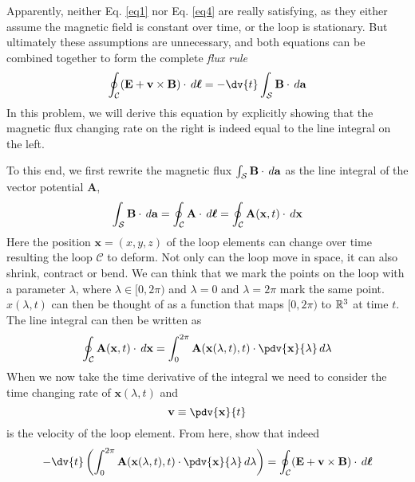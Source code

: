 \documentclass[10pt]{article}
\begin{document}
	Apparently, neither Eq. \ref{eq1} nor Eq. \ref{eq4} are really satisfying, as they either assume the
	magnetic field is constant over time, or the loop is stationary. But ultimately these assumptions are
	unnecessary, and both equations can be combined together to form the complete \textit{flux rule}
	\[
		\oint_{\mathcal{C}} (\mathbf{E} + \mathbf{v} \times \mathbf{B}) \cdot \diff \boldsymbol{\ell} =
		-\dv{t} \int_{\mathcal{S}}\mathbf{B} \cdot \diff \mathbf{a}
	\]
	In this problem, we will derive this equation by explicitly showing that the magnetic flux changing rate
	on the right is indeed equal to the line integral on the left. 

	To this end, we first rewrite the magnetic flux \( \int_{\mathcal{S}}\mathbf{B} \cdot \,d \mathbf{a} \)
	as the line integral of the vector potential \( \mathbf{A} \),
	\[
		\int_{\mathcal{S}}\mathbf{B} \cdot \,d \mathbf{a} = \oint_{\mathcal{C}}\mathbf{A} \cdot \,d
		\boldsymbol{\ell} = \oint_{\mathcal{C}} \mathbf{A} (\mathbf{x}, t) \cdot \,d \mathbf{x}
	\]
	Here the position \( \mathbf{x} = (x, y, z) \) of the loop elements can change over time resulting the
	loop \( \mathcal{C} \) to deform. Not only can the loop move in space, it can also shrink, contract or
	bend. We can think that we mark the points on the loop with a parameter \( \lambda \), where \( \lambda
	\in [0, 2\pi) \) and \( \lambda = 0 \) and \( \lambda = 2\pi \) mark the same point. \( x(\lambda, t) \)
	can then be thought of as a function that maps \( [0, 2\pi) \) to \( \mathbb R^3 \) at time \( t \). The line
	integral can then be written as
	\[
		\oint_{\mathcal{C}}\mathbf{A}(\mathbf{x}, t) \cdot \diff \mathbf{x} = \int_{0}^{2\pi}
		\mathbf{A}(\mathbf{x}(\lambda, t), t) \cdot \pdv{\mathbf{x}}{\lambda} \diff \lambda
	\]
	When we now take the time derivative of the integral we need to consider the time changing rate of \(
	\mathbf{x}(\lambda, t) \) and 
	\[
		\mathbf{v} \equiv \pdv{\mathbf{x}}{t}
	\]
	is the velocity of the loop element. From here, show that indeed
	\[
		-\dv{t}\left( \int_{0}^{2\pi} \mathbf{A}(\mathbf{x}(\lambda, t), t) \cdot \pdv{\mathbf{x}}{\lambda}
		\diff \lambda \right) = \oint_{\mathcal{C}}(\mathbf{E} + \mathbf{v} \times \mathbf{B}) \cdot \diff
		\boldsymbol{\ell}
	\]
\end{document}
